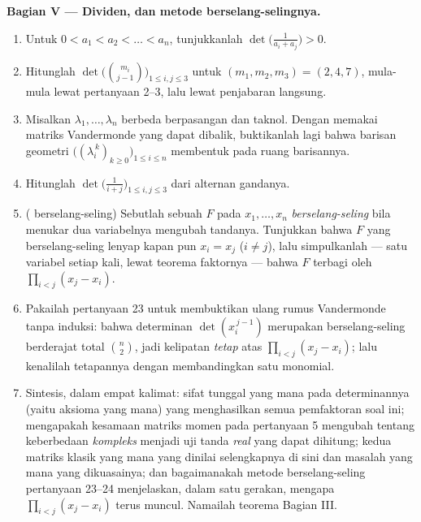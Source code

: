 \begin{problem}
\medskip
\noindent\textbf{Bagian V --- Dividen, dan metode
berselang-selingnya.}
\begin{enumerate}[resume]
  \item Untuk $0 < a_1 < a_2 < \dots < a_n$, tunjukkanlah
        $\det\bigl(\frac{1}{a_i + a_j}\bigr) > 0$.
  \item Hitunglah $\det\bigl(\binom{m_i}{j-1}\bigr)_{1 \leq i, j
        \leq 3}$ untuk $(m_1, m_2, m_3) = (2, 4, 7)$, mula-mula lewat
        pertanyaan 2--3, lalu lewat penjabaran langsung.
  \item Misalkan $\lambda_1, \dots, \lambda_n$ berbeda berpasangan
        dan taknol. Dengan memakai matriks Vandermonde yang dapat dibalik,
        buktikanlah lagi bahwa barisan geometri
        $\bigl((\lambda_i^{\,k})_{k \geq 0}\bigr)_{1 \leq i \leq
        n}$ membentuk  pada ruang barisannya.
  \item Hitunglah $\det\bigl(\frac{1}{i + j}\bigr)_{1 \leq i, j
        \leq 3}$ dari alternan gandanya.
  \item ( berselang-seling) Sebutlah sebuah  $F$ pada $x_1,
        \dots, x_n$ \emph{berselang-seling} bila menukar dua
        variabelnya mengubah tandanya. Tunjukkan bahwa $F$ yang berselang-seling
        lenyap kapan pun $x_i = x_j$ ($i \neq j$), lalu simpulkanlah
        --- satu variabel setiap kali, lewat teorema faktornya ---
        bahwa $F$ terbagi oleh $\prod_{i<j}(x_j - x_i)$.
  \item Pakailah pertanyaan 23 untuk membuktikan ulang rumus Vandermonde tanpa
        induksi: bahwa determinan $\det(x_i^{\,j-1})$ merupakan
         berselang-seling berderajat total $\binom n2$,
        jadi kelipatan \emph{tetap} atas $\prod_{i<j}(x_j -
        x_i)$; lalu kenalilah tetapannya dengan membandingkan satu monomial.
  \item Sintesis, dalam empat kalimat: sifat tunggal yang mana pada
        determinannya (yaitu aksioma yang mana) yang menghasilkan semua
        pemfaktoran soal ini; mengapakah kesamaan matriks momen
        pada pertanyaan 5 mengubah  tentang
        keberbedaan \emph{kompleks} menjadi uji tanda
        \emph{real} yang dapat dihitung; kedua matriks klasik yang mana yang
        dinilai selengkapnya di sini dan masalah  yang mana yang
        dikuasainya; dan bagaimanakah metode berselang-seling pertanyaan
        23--24 menjelaskan, dalam satu gerakan, mengapa $\prod_{i<j}(x_j -
        x_i)$ terus muncul. Namailah teorema Bagian III.

\end{enumerate}
\end{problem}
